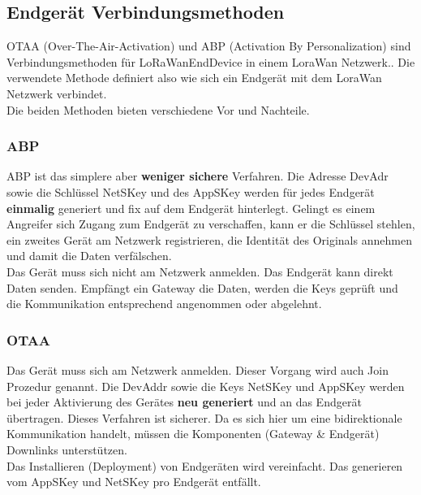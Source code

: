\documentclass[11pt,english,german]{report}
\theoremstyle{definition}
\begin{document}
\subsection{Endgerät Verbindungsmethoden}
OTAA (Over-The-Air-Activation) und ABP (Activation By Personalization) sind Verbindungsmethoden für \gls{LoRaWanEndDevice} in einem LoraWan Netzwerk.\cite{jaguar}. Die verwendete Methode definiert also wie sich ein Endgerät mit dem LoraWan Netzwerk verbindet. \\[0.3cm]
Die beiden Methoden bieten verschiedene Vor und Nachteile.

\subsubsection{ABP}
ABP ist das simplere aber \textbf{weniger sichere} Verfahren. Die Adresse DevAdr sowie die Schlüssel \gls{NetSKey} und des \gls{AppSKey} werden für jedes Endgerät \textbf{einmalig} generiert und fix auf dem Endgerät hinterlegt. Gelingt es einem Angreifer sich Zugang zum Endgerät zu verschaffen, kann er die Schlüssel stehlen, ein zweites Gerät am Netzwerk registrieren, die Identität des Originals annehmen und damit die Daten verfälschen.\\[0.3cm]
Das Gerät muss sich nicht am Netzwerk anmelden. Das Endgerät kann direkt Daten senden. Empfängt ein Gateway die Daten, werden die Keys geprüft und die Kommunikation entsprechend angenommen oder abgelehnt.

\subsubsection{OTAA}
Das Gerät muss sich am Netzwerk anmelden. Dieser Vorgang wird auch Join Prozedur genannt. Die \gls{DevAddr} sowie die Keys NetSKey und AppSKey werden bei jeder Aktivierung des Gerätes \textbf{neu generiert} und an das Endgerät übertragen. Dieses Verfahren ist sicherer. Da es sich hier um eine bidirektionale Kommunikation handelt, müssen die Komponenten (Gateway \& Endgerät) Downlinks unterstützen.\\[0.3cm]
Das Installieren (Deployment) von Endgeräten wird vereinfacht. Das generieren vom AppSKey und NetSKey pro Endgerät entfällt. 
\end{document}
